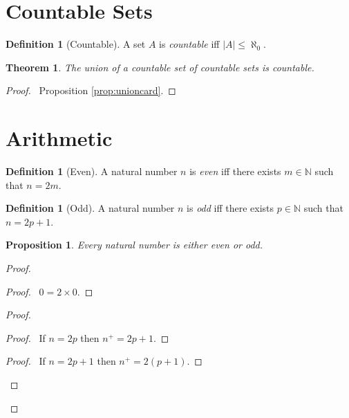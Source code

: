 \documentclass{book}
\let\qed\relax
\newtheorem{prop}[ax]{Proposition}
\newtheorem{thm}[ax]{Theorem}
\theoremstyle{definition}
\newtheorem{df}[ax]{Definition}
\begin{document}
\section{Countable Sets}

\begin{df}[Countable]
A set $A$ is \emph{countable} iff $|A| \leq \aleph_0$.
\end{df}

\begin{thm}
The union of a countable set of countable sets is countable.
\end{thm}

\begin{proof}
\pf\ Proposition \ref{prop:unioncard}. \qed
\end{proof}

\section{Arithmetic}

\begin{df}[Even]
A natural number $n$ is \emph{even} iff there exists $m \in \mathbb{N}$ such that $n = 2m$.
\end{df}

\begin{df}[Odd]
A natural number $n$ is \emph{odd} iff there exists $p \in \mathbb{N}$ such that $n = 2p+1$.
\end{df}

\begin{prop}
Every natural number is either even or odd.
\end{prop}

\begin{proof}
\pf
{}
\begin{proof}
	\pf\ $0 = 2 \times 0$.
\end{proof}
\begin{proof}
	\pf
	\begin{proof}
		\pf\ If $n = 2p$ then $n^+ = 2p+1$.
	\end{proof}
	\begin{proof}
		\pf\ If $n = 2p+1$ then $n^+ = 2(p+1)$.
	\end{proof}
\end{proof}
\qed
\end{proof}
\end{document}
